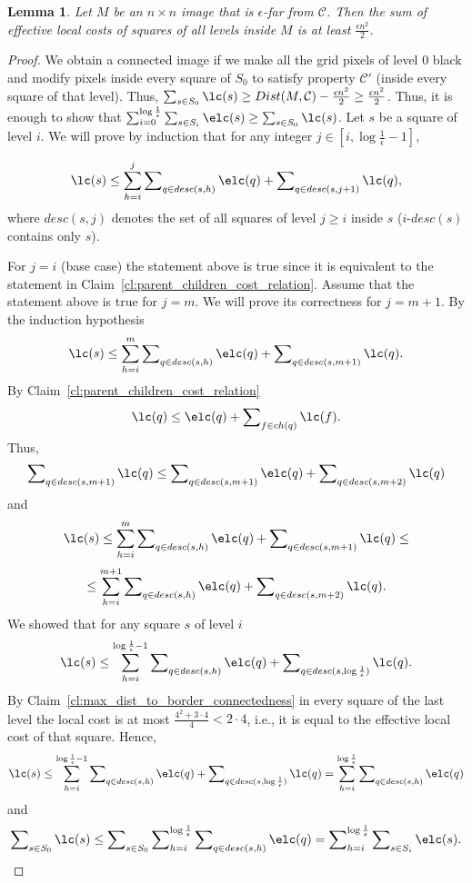 \documentclass[11pt,english]{article}
\newtheorem{lemma}[theorem]{Lemma}
\numberwithin{figure}{section}
\newcommand{\C}{{\mathcal C}}
\newcommand{\eps}{{\epsilon}}
\newcommand{\Dis}{Dist}
\begin{document}
\begin{lemma}
\label{lm:sum_of_local_costs}
Let $M$ be an $n\times n$ image that is $\eps$-far from $\C$. Then the sum of
effective local costs of squares of all levels inside $M$ is at least $\frac{\eps n^{2}}{2}$.
\end{lemma}
\begin{proof}
We obtain a connected image if we make all the grid pixels of level $0$ black and modify pixels inside every square of $S_{0}$ to satisfy property $\C'$
 (inside every square of that level).
Thus, $\sum\nolimits_{s\in S_{0}} \lc(s)\geq \Dis(M,\C)-\frac{\eps
n^{2}}{2}\geq\frac{\eps n^{2}}{2}$. Thus,
it is enough to show that
$\sum\nolimits_{i=0}^{\log\frac{1}{\eps}}\sum\nolimits_{s\in S_{i}}
\elc(s)\geq\sum\nolimits_{s\in S_{0}} \lc(s)$. Let $s$ be a square of level $i$. We will prove by induction that for any integer $j\in
[i,\log\frac{1}{\eps}-1],$


$$\lc(s)\leq\sum_{h=i}^{j}\sum\nolimits_{q\in
desc(s,h)}\elc(q)+\sum\nolimits_{q\in desc(s,j+1)}\lc(q),$$ where
$desc(s,j)$ denotes the set of all
squares of level $j\geq i$ inside $s$ ($i$-$desc(s)$ contains
only $s$).

For $j=i$ (base case) the statement above is true since it is equivalent to the
statement in Claim~\ref{cl:parent_children_cost_relation}. Assume
that the statement above is true for $j=m$. We will prove its correctness for
$j=m+1$.
By the induction hypothesis $$\lc(s)\leq\sum_{h=i}^{m}\sum\nolimits_{q\in
desc(s,h)}\elc(q)+\sum\nolimits_{q\in desc(s,m+1)}\lc(q).
$$
By Claim~\ref{cl:parent_children_cost_relation}
$$\lc(q)\leq
\elc(q)+\sum\nolimits_{f\in ch(q)}\lc(f).$$ Thus,
$$\sum\nolimits_{q\in
desc(s,m+1)}\lc(q)\leq \sum\nolimits_{q\in
desc(s,m+1)}\elc(q)+\sum\nolimits_{q\in desc(s,m+2)}\lc(q)$$ and
$$\lc(s)\leq\sum_{h=i}^{m}\sum\nolimits_{q\in
desc(s,h)}\elc(q)+\sum\nolimits_{q\in desc(s,m+1)}\lc(q)\leq
$$
$$
\leq
\sum_{h=i}^{m+1}\sum\nolimits_{q\in desc(s,h)}\elc(q)+\sum\nolimits_{q\in
desc(s,m+2)}\lc(q).
$$
We showed that for any square $s$ of level $i$
$$
\lc(s)\leq\sum_{h=i}^{\log \frac{1}{\eps}-1}\sum\nolimits_{q\in
desc(s,h)}\elc(q)+\sum\nolimits_{q\in desc(s,\log\frac{1}{\eps})}\lc(q).
$$
By Claim~\ref{cl:max_dist_to_border_connectedness} in every square of the last
level the local cost is at most $\frac{4^2+3\cdot 4}{4}<2\cdot 4$, i.e., it is equal to the effective local cost of that square. Hence,
$$\lc(s)\leq\sum_{h=i}^{\log \frac{1}{\eps}-1}\sum\nolimits_{q\in
desc(s,h)}\elc(q)+\sum\nolimits_{q\in
desc(s,\log\frac{1}{\eps})}\lc(q)=\sum_{h=i}^{\log\frac{1}{\eps}}\sum\nolimits_{q\in desc(s,h)}\elc(q)$$ and
$$\sum\nolimits_{s\in S_{0}}\lc(s)\leq
\sum\nolimits_{s\in
S_{0}}\sum\nolimits_{h=i}^{\log\frac{1}{\eps}}\sum\nolimits_{q\in
desc(s,h)}\elc(q)=\sum\nolimits_{h=i}^{\log\frac{1}{\eps}}\sum\nolimits_{s\in
S_{i}}\elc(s).$$
\end{proof}
\end{document}
